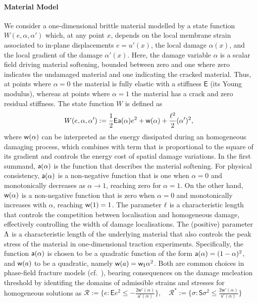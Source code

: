 \paragraph{Material Model}
We consider a one-dimensional brittle material modelled by a state function $W(e, \alpha, \alpha')$ which, at any point $x$,%
depends on the local membrane strain associated to in-plane displacements $e = u'(x)$, the local damage $\alpha(x)$, and the local gradient of the damage $\alpha'(x)$. Here, the damage variable $\alpha$ is a scalar field driving material softening, bounded between zero and one where zero indicates the undamaged material and one indicating the cracked material. Thus, at points where $\alpha=0$ the material is fully elastic with a stiffness $\mathsf{E}$ (its Young modulus), whereas at points where $\alpha=1$ the material has a crack and zero residual stiffness. %
The state function $W$ is defined as 
\begin{equation}
    \label{def:energy_material}
    W(e, \alpha, \alpha'):= \frac{1}{2} \mathsf{E} \mathsf{a}(\alpha)e^2 + \mathsf{w}(\alpha) + \frac{\ell^2}{2}(\alpha')^2,
\end{equation}
where $\mathsf{w}(\alpha)$ can be interpreted as the energy dissipated during an homogeneous damaging process, which combines with term that is proportional to the square of its gradient and controls the energy cost of spatial damage variations. In the first summand, $\mathsf{a}(\alpha)$ is the function that describes the material softening. %
For physical consistency, $\mathsf{a}(\alpha)$ is a non-negative function that is one when $\alpha=0$ and monotonically decreases as $\alpha\to 1$, reaching zero for $\alpha=1$. On the other hand, $\mathsf{w}(\alpha)$ is a non-negative function that is zero when $\alpha=0$ and monotonically increases with $\alpha$, reaching $\mathsf{w}(1)=1$. The parameter $\ell$ is a characteristic length that controls the competition between localisation and homogeneous damage, effectively controlling the width of damage localisations. The (positive) parameter $\Lambda$ is a characteristic length of the underlying material that also controls the peak stress of the material in one-dimensional traction experiments.
Specifically, the function $\mathsf{a}(\alpha)$ is chosen to be a quadratic function of the form $\mathsf{a}(\alpha) = (1-\alpha)^2$, and $\mathsf{w}(a)$ to be a quadratic, namely $\mathsf{w}(a) = \mathsf{w_1}\alpha^2$. Both are common choices in phase-field fracture models (cf.~\cite{Bourdin2000-pc,Miehe2010-sj,Miehe2010-ja}), bearing consequences on the damage nucleation threshold by identifing the domains of admissible strains and stresses for homogeneous solutions as
$\mathcal{R}:=\{e: \mathsf{E}e^2 \leq -\frac{2 \mathsf{w}'(\alpha)}{\mathsf{a}'(\alpha)}\}, \quad
\mathcal{R}^*:=\{\sigma: \mathsf{S}\sigma^2 \leq \frac{2 \mathsf{w}'(\alpha)}{\mathsf{s}'(\alpha)}\}$




